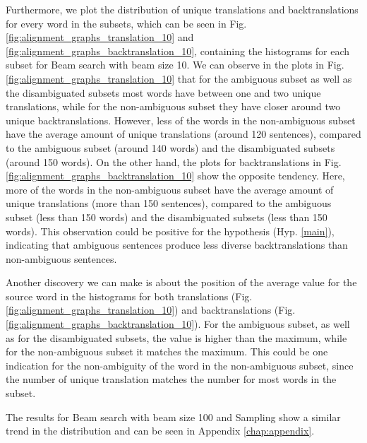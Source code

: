 Furthermore, we plot the distribution of unique translations and backtranslations for every word in the subsets, which can be seen in Fig. \ref{fig:alignment_graphs_translation_10} and \ref{fig:alignment_graphs_backtranslation_10}, containing the histograms for each subset for Beam search with beam size 10. 
We can observe in the plots in Fig. \ref{fig:alignment_graphs_translation_10} that for the ambiguous subset as well as the disambiguated subsets most words have between one and two unique translations, while for the non-ambiguous subset they have closer around two unique backtranslations. However, less of the words in the non-ambiguous subset have the average amount of unique translations (around 120 sentences), compared to the ambiguous subset (around 140 words) and the disambiguated subsets (around 150 words). 
On the other hand, the plots for backtranslations in Fig. \ref{fig:alignment_graphs_backtranslation_10} show the opposite tendency. Here, more of the words in the non-ambiguous subset have the average amount of unique translations (more than 150 sentences), compared to the ambiguous subset (less than 150 words) and the disambiguated subsets (less than 150 words). This observation could be positive for the hypothesis (Hyp. \ref{main}), indicating that ambiguous sentences produce less diverse backtranslations than non-ambiguous sentences.

Another discovery we can make is about the position of the average value for the source word in the histograms for both translations (Fig. \ref{fig:alignment_graphs_translation_10}) and backtranslations (Fig. \ref{fig:alignment_graphs_backtranslation_10}). For the ambiguous subset, as well as for the disambiguated subsets, the value is higher than the maximum, while for the non-ambiguous subset it matches the maximum. This could be one indication for the non-ambiguity of the word in the non-ambiguous subset, since the number of unique translation matches the number for most words in the subset. 

The results for Beam search with beam size 100 and Sampling show a similar trend in the distribution and can be seen in Appendix \ref{chap:appendix}.

